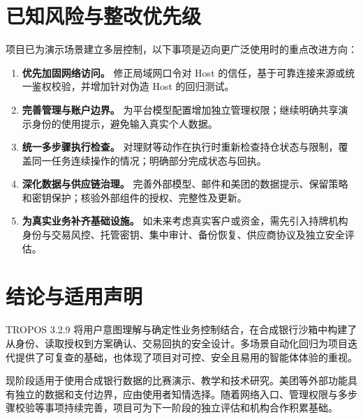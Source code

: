 \documentclass[journal,wp,nowatermark,nobib,clean]{paper}
\begin{document}
\section{已知风险与整改优先级}\label{sec:risk}
项目已为演示场景建立多层控制，以下事项是迈向更广泛使用时的重点改进方向：
\begin{enumerate}
\item \textbf{优先加固网络访问。} 修正局域网口令对 Host 的信任，基于可靠连接来源或统一鉴权校验，并增加针对伪造 Host 的回归测试。
\item \textbf{完善管理与账户边界。} 为平台模型配置增加独立管理权限；继续明确共享演示身份的使用提示，避免输入真实个人数据。
\item \textbf{统一多步骤执行检查。} 对理财等动作在执行时重新检查持仓状态与限制，覆盖同一任务连续操作的情况；明确部分完成状态与回执。
\item \textbf{深化数据与供应链治理。} 完善外部模型、邮件和美团的数据提示、保留策略和密钥保护；核验外部组件的授权、完整性及更新。
\item \textbf{为真实业务补齐基础设施。} 如未来考虑真实客户或资金，需先引入持牌机构身份与交易风控、托管密钥、集中审计、备份恢复、供应商协议及独立安全评估。
\end{enumerate}

\section{结论与适用声明}
TROPOS 3.2.9 将用户意图理解与确定性业务控制结合，在合成银行沙箱中构建了从身份、读取授权到方案确认、交易回执的安全设计。多场景自动化回归为项目迭代提供了可复查的基础，也体现了项目对可控、安全且易用的智能体体验的重视。

现阶段适用于使用合成银行数据的比赛演示、教学和技术研究。美团等外部功能具有独立的数据和支付边界，应由使用者知情选择。随着网络入口、管理权限与多步骤校验等事项持续完善，项目可为下一阶段的独立评估和机构合作积累基础。
\end{document}
